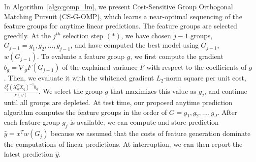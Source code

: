 \label{sec:algo_description}

%
%


In Algorithm~\ref{algo:gomp_lm}, we present Cost-Sensitive Group Orthogonal Matching Pursuit (CS-G-OMP), which learns a near-optimal sequencing of the
feature groups for anytime linear predictions. 
The feature groups are selected greedily. At the $j^{th}$ selection step $(*)$, we have chosen $j-1$ groups,
$G_{j-1} = g_1, g_2, ..., g_{j-1}$, and have computed 
the best model using $G_{j-1}$, $w(G_{j-1})$. 
To evaluate a feature group $g$,
we first compute the gradient $b_g = \nabla _g F(G_{j-1})$ of the 
explained variance $F$ with respect to the coefficients of $g$.
Then, we evaluate it with the whitened gradient $L_2$-norm square per unit cost, 
$\frac{b_g ^T (X_{g}^TX_g)^{-1}b_g}{ c(g) }$. We select the group $g$ that 
maximizes this value as $g_j$, and continue until all groups
are depleted. At test time, our proposed anytime prediction algorithm computes the feature groups in the order of $G = g_1, g_2, ..., g_J$. After each feature group $g_j$ is available, we can compute and store prediction $\hat{y} = x^Tw(G_j)$ because we assumed that 
the costs of feature generation dominate the computations of linear predictions. At interruption,
we can then report the latest prediction $\hat{y}$. 

